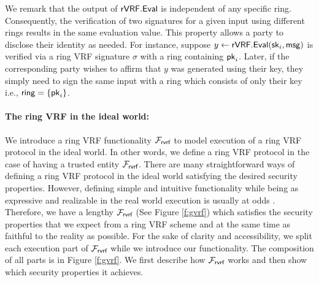 We remark that the output of ${\mathsf{rVRF}}.{\mathsf{Eval}}$ is independent of any specific ring.  Consequently, the verification of two signatures for a given input using different rings results in the same evaluation value.  This property allows a party to disclose their identity as needed.  For instance, suppose $y \leftarrow {\ensuremath{\mathsf{rVRF}}}.{\mathsf{Eval}}(\mathsf{sk}_i, \mathsf{msg})$ is verified via a ring VRF signature $\sigma$ with a ring containing $\mathsf{pk}_i$.  Later, if the corresponding party wishes to affirm that $y$ was generated using their key, they simply need to sign the same input with a ring which consists of only their key i.e., $ \mathsf{ring} = \{\mathsf{pk}_i\} $.







\paragraph{The ring VRF in the ideal world:} We introduce a ring VRF functionality $ \mathcal{F}_{\textsf{rvrf}} $ to model execution of a ring VRF protocol in the ideal world. In other words, we define a ring VRF protocol in the case of having a trusted entity $ \mathcal{F}_{\textsf{rvrf}} $. There are many straightforward ways of defining a ring VRF protocol in the ideal world satisfying the desired security properties. However, defining simple and intuitive functionality while being as expressive and realizable in the real world execution is usually at odds \cite{canetti1}. Therefore, we have a lengthy $ \mathcal{F}_{\textsf{rvrf}} $ (See Figure \ref{f:gvrf}) which satisfies the security properties that we expect from a ring VRF scheme and at the same time as faithful to the reality as possible. For the sake of clarity and accessibility, we split each execution part of $ \mathcal{F}_{\textsf{rvrf}} $ while we introduce our functionality. The composition of all parts is in Figure \ref{f:gvrf}. We first describe how $  \mathcal{F}_{\textsf{rvrf}} $ works and then show which security properties it achieves.


